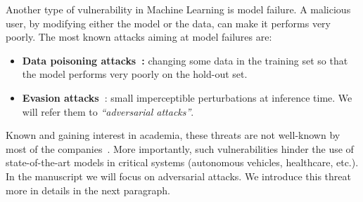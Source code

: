     
    
Another type of vulnerability in Machine Learning is model failure. A malicious user, by modifying either the model or the data, can make it performs very poorly. The most known attacks aiming at model failures are:
\begin{itemize}
    \item \textbf{Data poisoning attacks~\citep{kearns1993learning}:} changing some data in the training set so that the model performs very poorly on the hold-out set. 
    \item \textbf{Evasion attacks~\citep{biggio2013evasion,Szegedy2013IntriguingPO}}: small imperceptible perturbations at inference time. We will refer them to \emph{``adversarial attacks''}.
\end{itemize}
    
Known and gaining interest in academia, these threats are not well-known by most of the companies~\citep{kumar2020adversarial}. More importantly, such vulnerabilities  hinder the use of state-of-the-art models in critical systems (autonomous vehicles, healthcare, etc.). In the manuscript we will focus on adversarial attacks.  We introduce this threat more in details in the next paragraph.

